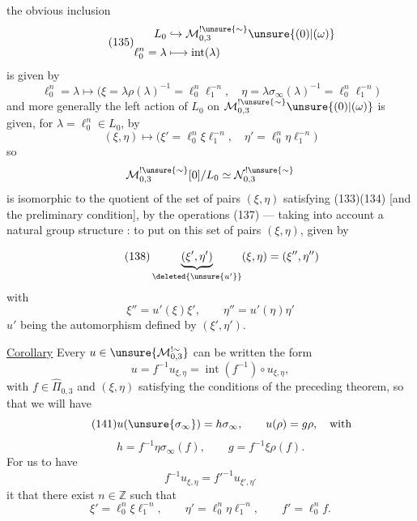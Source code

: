 
 the obvious inclusion
\[
\tag{135}
\begin{aligned}
L_0&\hookrightarrow\mathcal M_{0,3}^{!\unsure{\sim}}\unsure{(0)|(\omega)}\\
\ell_0^n=\lambda&\longmapsto\operatorname{int}(\lambda)
\end{aligned}
\]
is given by
\[
\tag{136}
\ell_0^n=\lambda\longmapsto
\bigl(\xi=\lambda\rho(\lambda)^{-1}=\ell_0^n\ell_1^{-n},
\quad\eta=\lambda\sigma_\infty(\lambda)^{-1}=\ell_0^n\ell_1^{-n}\bigr)
\]
and more generally the left action of $L_0$ on
$\mathcal M_{0,3}^{!\unsure{\sim}}\unsure{(0)|(\omega)}$ is given,
for $\lambda=\ell_0^n\in L_0$, by
\[
\tag{137}
(\xi,\eta)\longmapsto
\bigl(\xi'=\ell_0^n\xi\ell_1^{-n},\quad
\eta'=\ell_0^n\eta\ell_1^{-n}\bigr)
\]
so
\[
\mathcal M_{0,3}^{!\unsure{\sim}}[0]/L_0
\simeq\mathcal N_{0,3}^{!\unsure{\sim}}
\]
is isomorphic to the quotient of the set of pairs $(\xi,\eta)$
satisfying (133)(134) [and the preliminary condition], by the operations
(137) --- taking into account a 
natural group structure : to put on this set of pairs
$(\xi,\eta)$, given by


\[
\tag{138}
\underbrace{(\xi',\eta')}_{\deleted{\unsure{u'}}}(\xi,\eta)=(\xi'',\eta'')
\]
with
\[
\tag{139}
\xi''=u'(\xi)\xi',\qquad \eta''=u'(\eta)\eta'
\]
$u'$ being the automorphism defined by $(\xi',\eta')$.

\uline{Corollary} Every $u\in\unsure{\mathcal M_{0,3}^{!\sim}}$ can be written  the form
\[
\tag{140}
u=f^{-1}u_{\xi,\eta}=\operatorname{int}(f^{-1})\circ u_{\xi,\eta},
\]
with $f\in\widehat{\Pi}_{0,3}$ and $(\xi,\eta)$ satisfying the conditions of the preceding theorem, so that we will have
\[
\tag{141}
u(\unsure{\sigma_\infty})=h\sigma_\infty,\qquad u(\rho)=g\rho,\quad\text{with}
\]
\[
\tag{143}
h=f^{-1}\eta\sigma_\infty(f),\qquad g=f^{-1}\xi\rho(f).
\]
For us to have
\[
f^{-1}u_{\xi,\eta}=f'^{-1}u_{\xi',\eta'}
\]
it  that there exist $n\in\mathbb Z$ such that
\[
\tag{144}
\xi'=\ell_0^n\xi\ell_1^{-n},\qquad
\eta'=\ell_0^n\eta\ell_1^{-n},\qquad f'=\ell_0^n f.
\]

